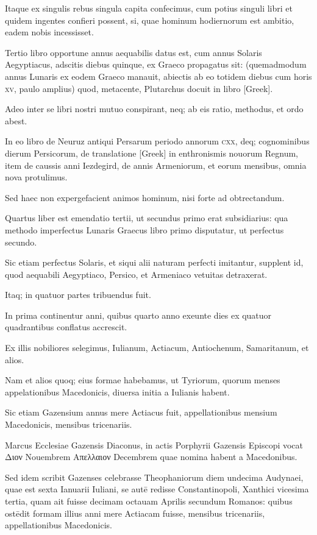 \begin{parnumbers}
Itaque ex singulis rebus singula capita
confecimus, cum potius singuli libri et quidem ingentes confieri
possent, si, quae hominum hodiernorum est ambitio, eadem nobis
incessisset.

Tertio libro opportune annus aequabilis datus est,
cum annus Solaris Aegyptiacus, adscitis diebus quinque, ex Graeco
propagatus sit: (quemadmodum annus Lunaris ex eodem Graeco
manauit, abiectis ab eo totidem diebus cum horis \textsc{xv}, paulo amplius)
quod, metacente, Plutarchus docuit in libro \textgreek{[Greek]}.

Adeo inter se libri nostri mutuo conspirant, neq; ab eis ratio,
methodus, et ordo abest.

In eo libro de Neuruz antiqui Persarum
periodo annorum \textsc{cxx}, deq; cognominibus dierum Persicorum,
de translatione \textgreek{[Greek]} in enthronismis nouorum Regnum,
item de caussis anni Iezdegird, de annis Armeniorum, et eorum
mensibus, omnia nova protulimus. 

Sed haec non expergefacient animos
hominum, nisi forte ad obtrectandum.

Quartus liber est emendatio
tertii, ut secundus primo erat subsidiarius: qua methodo imperfectus
Lunaris Graecus libro primo disputatur, ut perfectus secundo.

Sic etiam perfectus Solaris, et siqui alii naturam perfecti imitantur,
supplent id, quod aequabili Aegyptiaco, Persico, et Armeniaco
vetuitas detraxerat.

Itaq; in quatuor partes tribuendus fuit.

In
prima continentur anni, quibus quarto anno exeunte dies ex quatuor
quadrantibus conflatus accrescit.

Ex illis nobiliores selegimus,
Iulianum, Actiacum, Antiochenum, Samaritanum, et alios. 

Nam et alios quoq; eius formae habebamus, ut Tyriorum, quorum menses
appelationibus Macedonicis, diuersa initia a Iulianis habent.

Sic
etiam Gazensium annus mere Actiacus fuit, appellationibus mensium 
Macedonicis, mensibus tricenariis. 

Marcus Ecclesiae Gazensis Diaconus,
in actis Porphyrii Gazensis Episcopi vocat \textgreek{Διον} Nouembrem
\textgreek{Απελλαιον} Decembrem quae nomina habent a Macedonibus. 

Sed
idem scribit Gazenses celebrasse Theophaniorum diem undecima
Audynaei, quae est sexta Ianuarii Iuliani, se autē redisse Constantinopoli,
Xanthici vicesima tertia, quam ait fuisse decimam octauam
Aprilis secundum Romanos: quibus ostēdit formam illius anni mere
Actiacam fuisse, mensibus tricenariis, appellationibus Macedonicis. 


\end{parnumbers}
